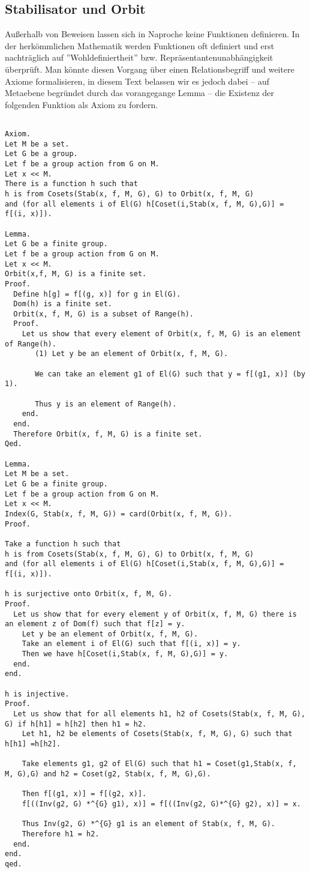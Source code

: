 \documentclass[a4paper,12pt]{scrartcl}
\begin{document}
\subsection{Stabilisator und Orbit}

Außerhalb von Beweisen lassen sich in Naproche keine Funktionen definieren. In der herkömmlichen Mathematik werden Funktionen oft definiert und erst nachträglich auf ''Wohldefiniertheit'' bzw. Repräsentantenunabhängigkeit überprüft.
Man könnte diesen Vorgang über einen Relationsbegriff und weitere Axiome formalisieren, in diesem Text belassen wir es jedoch dabei -- auf Metaebene begründet durch das vorangegange Lemma -- die Existenz der folgenden Funktion als Axiom zu fordern.

\begin{lstlisting}

Axiom.
Let M be a set.
Let G be a group.
Let f be a group action from G on M.
Let x << M.
There is a function h such that
h is from Cosets(Stab(x, f, M, G), G) to Orbit(x, f, M, G)
and (for all elements i of El(G) h[Coset(i,Stab(x, f, M, G),G)] = f[(i, x)]).

Lemma.
Let G be a finite group.
Let f be a group action from G on M.
Let x << M.
Orbit(x,f, M, G) is a finite set.
Proof.
  Define h[g] = f[(g, x)] for g in El(G).
  Dom(h) is a finite set.
  Orbit(x, f, M, G) is a subset of Range(h).
  Proof.
    Let us show that every element of Orbit(x, f, M, G) is an element of Range(h).
       (1) Let y be an element of Orbit(x, f, M, G).

       We can take an element g1 of El(G) such that y = f[(g1, x)] (by 1).

       Thus y is an element of Range(h).
    end.
  end.
  Therefore Orbit(x, f, M, G) is a finite set.
Qed.

Lemma.
Let M be a set.
Let G be a finite group.
Let f be a group action from G on M.
Let x << M.
Index(G, Stab(x, f, M, G)) = card(Orbit(x, f, M, G)).
Proof.

Take a function h such that
h is from Cosets(Stab(x, f, M, G), G) to Orbit(x, f, M, G)
and (for all elements i of El(G) h[Coset(i,Stab(x, f, M, G),G)] = f[(i, x)]).

h is surjective onto Orbit(x, f, M, G).
Proof.
  Let us show that for every element y of Orbit(x, f, M, G) there is an element z of Dom(f) such that f[z] = y.
    Let y be an element of Orbit(x, f, M, G).
    Take an element i of El(G) such that f[(i, x)] = y.
    Then we have h[Coset(i,Stab(x, f, M, G),G)] = y.
  end.
end.

h is injective.
Proof.
  Let us show that for all elements h1, h2 of Cosets(Stab(x, f, M, G), G) if h[h1] = h[h2] then h1 = h2.
    Let h1, h2 be elements of Cosets(Stab(x, f, M, G), G) such that h[h1] =h[h2].
    
    Take elements g1, g2 of El(G) such that h1 = Coset(g1,Stab(x, f, M, G),G) and h2 = Coset(g2, Stab(x, f, M, G),G).
  
    Then f[(g1, x)] = f[(g2, x)].
    f[((Inv(g2, G) *^{G} g1), x)] = f[((Inv(g2, G)*^{G} g2), x)] = x.
    
    Thus Inv(g2, G) *^{G} g1 is an element of Stab(x, f, M, G).
    Therefore h1 = h2.
  end.
end.
qed.
\end{lstlisting}
\end{document}
